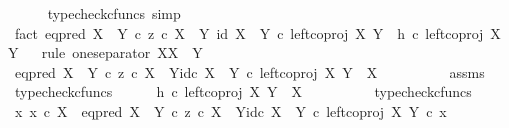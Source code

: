 \begin{isabellebody}
\ \ \ \ \isamarkupfalse%
\ {\isacharparenleft}{\kern0pt}typecheck{\isacharunderscore}{\kern0pt}cfuncs{\isacharcomma}{\kern0pt}\ simp{\isacharparenright}{\kern0pt}\isanewline
\isanewline
\ \ \isamarkupfalse%
\ fact{}{\isacharcolon}{\kern0pt}\ {\isachardoublequoteopen}{\isacharparenleft}{\kern0pt}eq{\isacharunderscore}{\kern0pt}pred\ {\isacharparenleft}{\kern0pt}X\ {\isasymCoprod}\ Y{\isacharparenright}{\kern0pt}\ {\isasymcirc}\isactrlsub c\ {\isasymlangle}z\ {\isasymcirc}\isactrlsub c\ {\isasymbeta}\isactrlbsub X\ {\isasymCoprod}\ Y\isactrlesub {\isacharcomma}{\kern0pt}\ id\ {\isacharparenleft}{\kern0pt}X\ {\isasymCoprod}\ Y{\isacharparenright}{\kern0pt}{\isasymrangle}{\isacharparenright}{\kern0pt}\ {\isasymcirc}\isactrlsub c\ left{\isacharunderscore}{\kern0pt}coproj\ X\ Y\ {\isacharequal}{\kern0pt}\ h\ {\isasymcirc}\isactrlsub c\ left{\isacharunderscore}{\kern0pt}coproj\ X\ Y{\isachardoublequoteclose}\isanewline
\ \ \isamarkupfalse%
{\isacharparenleft}{\kern0pt}rule\ one{\isacharunderscore}{\kern0pt}separator{\isacharbrackleft}{\kern0pt}\ X{\isacharequal}{\kern0pt}X{\isacharcomma}{\kern0pt}\ \ Y\ {\isacharequal}{\kern0pt}\ {\isasymOmega}{\isacharbrackright}{\kern0pt}{\isacharparenright}{\kern0pt}\isanewline
\ \ \ \ \isamarkupfalse%
\ {\isachardoublequoteopen}{\isacharparenleft}{\kern0pt}eq{\isacharunderscore}{\kern0pt}pred\ {\isacharparenleft}{\kern0pt}X\ {\isasymCoprod}\ Y{\isacharparenright}{\kern0pt}\ {\isasymcirc}\isactrlsub c\ {\isasymlangle}z\ {\isasymcirc}\isactrlsub c\ {\isasymbeta}\isactrlbsub X\ {\isasymCoprod}\ Y\isactrlesub {\isacharcomma}{\kern0pt}id\isactrlsub c\ {\isacharparenleft}{\kern0pt}X\ {\isasymCoprod}\ Y{\isacharparenright}{\kern0pt}{\isasymrangle}{\isacharparenright}{\kern0pt}\ {\isasymcirc}\isactrlsub c\ left{\isacharunderscore}{\kern0pt}coproj\ X\ Y\ {\isacharcolon}{\kern0pt}\ X\ {\isasymrightarrow}\ {\isasymOmega}{\isachardoublequoteclose}\isanewline
\ \ \ \ \ \ \isamarkupfalse%
\ assms\ \isamarkupfalse%
\ typecheck{\isacharunderscore}{\kern0pt}cfuncs\isanewline
\ \ \ \ \isamarkupfalse%
\ {\isachardoublequoteopen}h\ {\isasymcirc}\isactrlsub c\ left{\isacharunderscore}{\kern0pt}coproj\ X\ Y\ {\isacharcolon}{\kern0pt}\ X\ {\isasymrightarrow}\ {\isasymOmega}{\isachardoublequoteclose}\isanewline
\ \ \ \ \ \ \isamarkupfalse%
\ typecheck{\isacharunderscore}{\kern0pt}cfuncs\isanewline
\ \ \ \ \isamarkupfalse%
\ {\isachardoublequoteopen}{\isasymAnd}x{\isachardot}{\kern0pt}\ x\ {\isasymin}\isactrlsub c\ X\ {\isasymLongrightarrow}\ {\isacharparenleft}{\kern0pt}{\isacharparenleft}{\kern0pt}eq{\isacharunderscore}{\kern0pt}pred\ {\isacharparenleft}{\kern0pt}X\ {\isasymCoprod}\ Y{\isacharparenright}{\kern0pt}\ {\isasymcirc}\isactrlsub c\ {\isasymlangle}z\ {\isasymcirc}\isactrlsub c\ {\isasymbeta}\isactrlbsub X\ {\isasymCoprod}\ Y\isactrlesub {\isacharcomma}{\kern0pt}id\isactrlsub c\ {\isacharparenleft}{\kern0pt}X\ {\isasymCoprod}\ Y{\isacharparenright}{\kern0pt}{\isasymrangle}{\isacharparenright}{\kern0pt}\ {\isasymcirc}\isactrlsub c\ left{\isacharunderscore}{\kern0pt}coproj\ X\ Y{\isacharparenright}{\kern0pt}\ {\isasymcirc}\isactrlsub c\ x\ {\isacharequal}{\kern0pt}\isanewline

\end{isabellebody}
